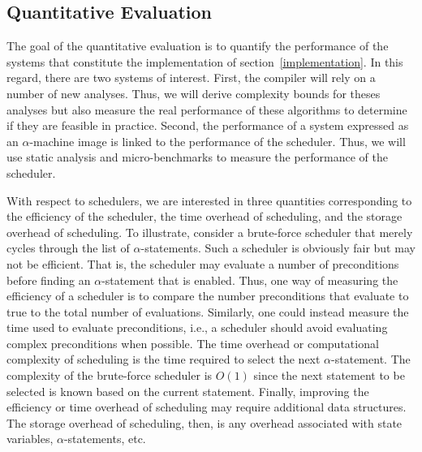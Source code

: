 

\subsection{Quantitative Evaluation}

The goal of the quantitative evaluation is to quantify the performance of the systems that constitute the implementation of section~\ref{implementation}.
In this regard, there are two systems of interest.
First, the compiler will rely on a number of new analyses.
Thus, we will derive complexity bounds for theses analyses but also measure the real performance of these algorithms to determine if they are feasible in practice.
Second, the performance of a system expressed as an $\alpha$-machine image is linked to the performance of the scheduler.
Thus, we will use static analysis and micro-benchmarks to measure the performance of the scheduler.

With respect to schedulers, we are interested in three quantities corresponding to the efficiency of the scheduler, the time overhead of scheduling, and the storage overhead of scheduling.
To illustrate, consider a brute-force scheduler that merely cycles through the list of $\alpha$-statements.
Such a scheduler is obviously fair but may not be efficient.
That is, the scheduler may evaluate a number of preconditions before finding an $\alpha$-statement that is enabled.
Thus, one way of measuring the efficiency of a scheduler is to compare the number preconditions that evaluate to true to the total number of evaluations.
Similarly, one could instead measure the time used to evaluate preconditions, i.e., a scheduler should avoid evaluating complex preconditions when possible.
The time overhead or computational complexity of scheduling is the time required to select the next $\alpha$-statement.
The complexity of the brute-force scheduler is $O(1)$ since the next statement to be selected is known based on the current statement.
Finally, improving the efficiency or time overhead of scheduling may require additional data structures.
The storage overhead of scheduling, then, is any overhead associated with state variables, $\alpha$-statements, etc.

